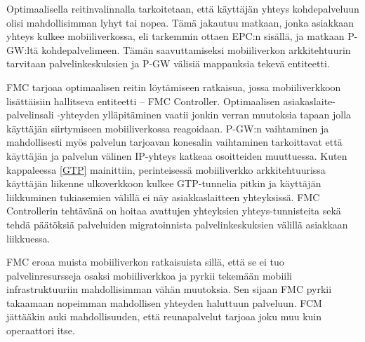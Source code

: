 Optimaalisella reitinvalinnalla tarkoitetaan, että käyttäjän yhteys kohdepalveluun olisi mahdollisimman lyhyt tai nopea. Tämä jakautuu matkaan, jonka asiakkaan yhteys kulkee mobiiliverkossa, eli tarkemmin ottaen EPC:n sisällä, ja matkaan P-GW:ltä kohdepalvelimeen. Tämän saavuttamiseksi mobiiliverkon arkkitehtuurin tarvitaan palvelinkeskuksien ja P-GW välisiä mappauksia tekevä entiteetti. 

FMC tarjoaa optimaalisen reitin löytämiseen ratkaisua, jossa mobiiliverkkoon lisättäisiin hallitseva entiteetti – FMC Controller. 
Optimaalisen asiakaslaite-palvelinsali -yhteyden ylläpitäminen vaatii jonkin verran muutoksia tapaan jolla käyttäjän siirtymiseen mobiiliverkossa reagoidaan. P-GW:n vaihtaminen ja mahdollisesti myös palvelun tarjoavan konesalin vaihtaminen tarkoittavat että käyttäjän ja palvelun välinen IP-yhteys katkeaa osoitteiden muuttuessa. Kuten kappaleessa \ref{GTP} mainittiin, perinteisessä mobiiliverkko arkkitehtuurissa käyttäjän liikenne ulkoverkkoon kulkee GTP-tunnelia pitkin ja käyttäjän liikkuminen tukiasemien välillä ei näy asiakkaslaitteen yhteyksissä. FMC Controllerin tehtävänä on hoitaa avattujen yhteyksien yhteys-tunnisteita sekä tehdä päätöksiä palveluiden migratoinnista palvelinkeskuksien välillä asiakkaan liikkuessa.

FMC eroaa muista mobiiliverkon ratkaisuista sillä, että se ei tuo palvelinresursseja osaksi mobiiliverkkoa ja pyrkii tekemään mobiili infrastruktuuriin mahdollisimman vähän muutoksia. Sen sijaan FMC pyrkii takaamaan nopeimman mahdollisen yhteyden haluttuun palveluun. FCM jättääkin auki mahdollisuuden, että reunapalvelut tarjoaa joku muu kuin operaattori itse.
